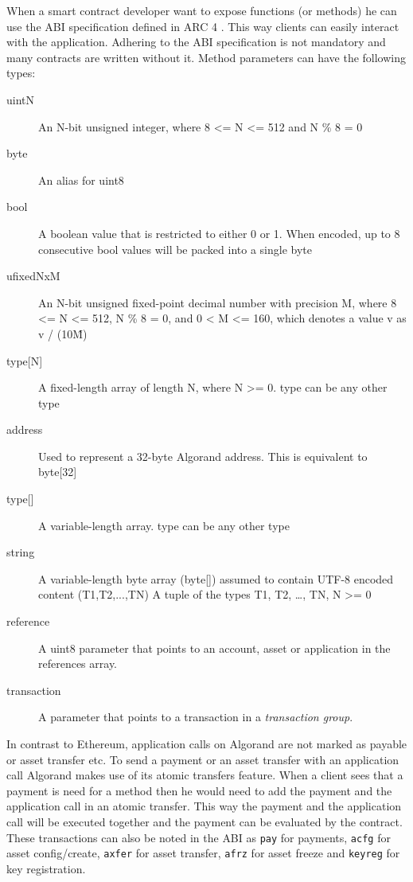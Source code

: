 When a smart contract developer want to expose functions (or methods) he can use the \ac{ABI} specification defined in \ac{ARC} 4 \cite{noauthor_arcsarcsarc-0004md_nodate}. This way clients can easily interact with the application. Adhering to the \ac{ABI} specification is not mandatory and many contracts are written without it. Method parameters can have the following types:
\begin{description}
    \item[uintN] An N-bit unsigned integer, where 8 <= N <= 512 and N \% 8 = 0
    \item[byte]	An alias for uint8
    \item[bool]	A boolean value that is restricted to either 0 or 1. When encoded, up to 8 consecutive bool values will be packed into a single byte
    \item[ufixedNxM] An N-bit unsigned fixed-point decimal number with precision M, where 8 <= N <= 512, N \% 8 = 0, and 0 < M <= 160, which denotes a value v as v / (10\^M)

        \item[{type[N]}] A fixed-length array of length N, where N >= 0. type can be any other type
    \item[address] Used to represent a 32-byte Algorand address. This is equivalent to byte[32]

        \item[{type[]}] A variable-length array. type can be any other type
    \item[string] A variable-length byte array (byte[]) assumed to contain UTF-8 encoded content
        (T1,T2,...,TN) A tuple of the types T1, T2, …, TN, N >= 0
    \item[reference] A uint8 parameter that points to an account, asset or application in the references array.
    \item[transaction] A parameter that points to a transaction in a \textit{transaction group}.
\end{description}

In contrast to Ethereum, application calls on Algorand are not marked as payable or asset transfer etc. To send a payment or an asset transfer with an application call Algorand makes use of its atomic transfers feature. When a client sees that a payment is need for a method then he would need to add the payment and the application call in an atomic transfer. This way the payment and the application call will be executed together and the payment can be evaluated by the contract. These transactions can also be noted in the \ac{ABI} as \texttt{pay} for payments, \texttt{acfg} for asset config/create, \texttt{axfer} for asset transfer, \texttt{afrz} for asset freeze and \texttt{keyreg} for key registration.


